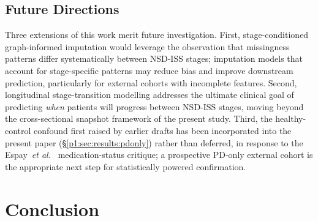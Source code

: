\subsection{Future Directions}
Three extensions of this work merit future investigation. First, stage-conditioned graph-informed imputation would leverage the observation that missingness patterns differ systematically between NSD-ISS stages; imputation models that account for stage-specific patterns may reduce bias and improve downstream prediction, particularly for external cohorts with incomplete features. Second, longitudinal stage-transition modelling addresses the ultimate clinical goal of predicting \emph{when} patients will progress between NSD-ISS stages, moving beyond the cross-sectional snapshot framework of the present study. Third, the healthy-control confound first raised by earlier drafts has been incorporated into the present paper (\S\ref{p1:sec:results:pdonly}) rather than deferred, in response to the Espay~\textit{et al.}~\cite{espay2025med} medication-status critique; a prospective PD-only external cohort is the appropriate next step for statistically powered confirmation.

\section{Conclusion}
\label{p1:sec:conclusion}


